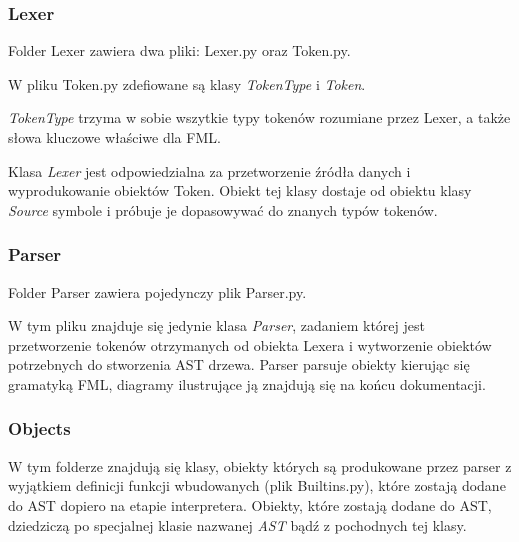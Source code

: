 \documentclass[12pt,a4paper]{article}
\begin{document}
\subsubsection{Lexer}

Folder Lexer zawiera dwa pliki: Lexer.py oraz Token.py.

W pliku Token.py zdefiowane są klasy \emph{TokenType} i \emph{Token}.

\emph{TokenType} trzyma w sobie wszytkie typy tokenów rozumiane przez Lexer, a także słowa kluczowe właściwe dla FML. 

Klasa \emph{Lexer} jest odpowiedzialna za przetworzenie źródła danych i wyprodukowanie obiektów Token. Obiekt tej klasy dostaje od obiektu klasy \emph{Source} symbole i próbuje je dopasowywać do znanych typów tokenów.

\subsubsection{Parser}

Folder Parser zawiera pojedynczy plik Parser.py.

W tym pliku znajduje się jedynie klasa \emph{Parser}, zadaniem której jest przetworzenie tokenów otrzymanych od obiekta Lexera i wytworzenie obiektów potrzebnych do stworzenia AST drzewa. Parser parsuje obiekty kierując się gramatyką FML, diagramy ilustrujące ją znajdują się na końcu dokumentacji.

\subsubsection{Objects}

W tym folderze znajdują się klasy, obiekty których są produkowane przez parser z wyjątkiem definicji funkcji wbudowanych (plik Builtins.py), które zostają dodane do AST dopiero na etapie interpretera. Obiekty, które zostają dodane do AST, dziedziczą po specjalnej klasie nazwanej \emph{AST} bądź z pochodnych tej klasy.
\end{document}
